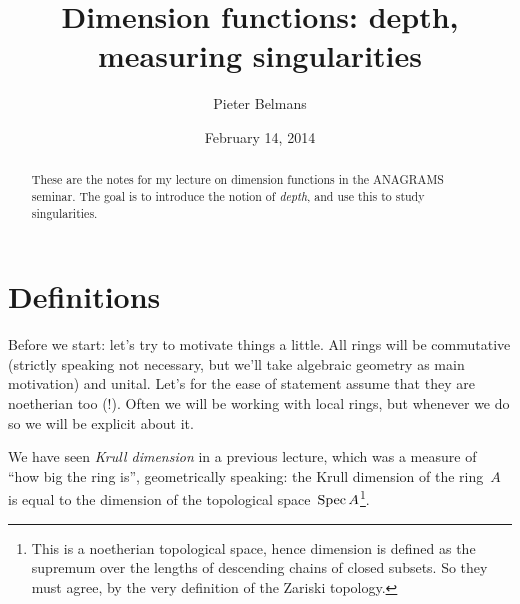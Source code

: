 \documentclass[10pt,a4paper]{article}
\title{Dimension functions: depth, measuring singularities}
\author{Pieter Belmans}
\date{February 14, 2014}
\begin{document}
\maketitle

\begin{abstract}
  These are the notes for my lecture on dimension functions in the ANAGRAMS seminar. The goal is to introduce the notion of \emph{depth}, and use this to study singularities.
\end{abstract}

\tableofcontents

\clearpage

\section{Definitions}
Before we start: let's try to motivate things a little. All rings will be commutative (strictly speaking not necessary, but we'll take algebraic geometry as main motivation) and unital. Let's for the ease of statement assume that they are noetherian too (!). Often we will be working with local rings, but whenever we do so we will be explicit about it.

We have seen \emph{Krull dimension} in a previous lecture, which was a measure of ``how big the ring is'', geometrically speaking: the Krull dimension of the ring~$A$ is equal to the dimension of the topological space~$\operatorname{Spec} A$\footnote{This is a noetherian topological space, hence dimension is defined as the supremum over the lengths of descending chains of closed subsets. So they must agree, by the very definition of the Zariski topology.}.
\end{document}
